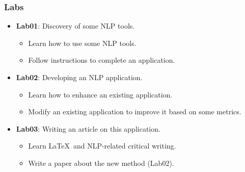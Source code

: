 \documentclass{beamer}
\begin{document}
\begin{frame}
	\frametitle{Labs}
	
	\begin{itemize}
		\item \textbf{Lab01}: Discovery of some NLP tools.
		\begin{itemize}
			\item {} Learn how to use some NLP tools.
			\item {} Follow instructions to complete an application.
		\end{itemize}
		\item \textbf{Lab02}: Developing an NLP application.
		\begin{itemize}
			\item {} Learn how to enhance an existing application.
			\item {} Modify an existing application to improve it based on some metrics.
		\end{itemize}
		\item \textbf{Lab03}: Writing an article on this application.
		\begin{itemize}
			\item {} Learn \LaTeX\ and NLP-related critical writing.
			\item {} Write a paper about the new method (Lab02).
		\end{itemize}
	\end{itemize}
	
\end{frame}
\end{document}
